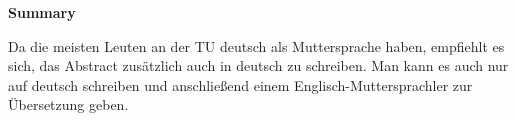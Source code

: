 \thispagestyle{empty}
\vspace*{0.2cm}

\begin{center}
    \textbf{Summary}
\end{center}

\vspace*{0.2cm}

\noindent 
Da die meisten Leuten an der TU deutsch als Muttersprache haben, empfiehlt es sich, das Abstract zusätzlich auch in deutsch zu schreiben. Man kann es auch nur auf deutsch schreiben und anschließend einem Englisch-Muttersprachler zur Übersetzung geben.